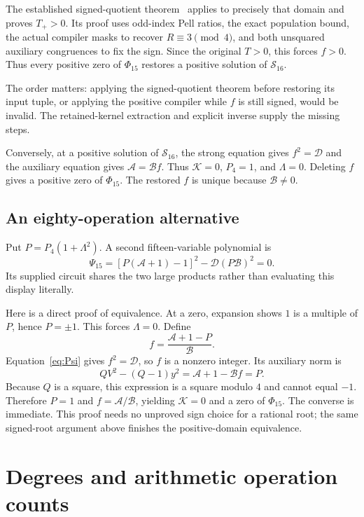 \documentclass[11pt]{article}
\theoremstyle{remark}\newtheorem{remark}[theorem]{Remark}
\begin{document}
The established signed-quotient theorem~\cite{SignedSoundness} applies to precisely that domain and proves $T_+>0$. Its proof uses odd-index Pell ratios, the exact population bound, the actual compiler masks to recover $R\equiv3\pmod4$, and both unsquared auxiliary congruences to fix the sign. Since the original $T>0$, this forces $f>0$. Thus every positive zero of $\Phi_{15}$ restores a positive solution of $\mathcal S_{16}$.

The order matters: applying the signed-quotient theorem before restoring its input tuple, or applying the positive compiler while $f$ is still signed, would be invalid. The retained-kernel extraction and explicit inverse supply the missing steps.

Conversely, at a positive solution of $\mathcal S_{16}$, the strong equation gives $f^2=\mathcal D$ and the auxiliary equation gives $\mathcal A=\mathcal Bf$. Thus $\mathcal K=0$, $P_4=1$, and $\Lambda=0$. Deleting $f$ gives a positive zero of $\Phi_{15}$. The restored $f$ is unique because $\mathcal B\ne0$.

\subsection{An eighty-operation alternative}

Put $P=P_4(1+\Lambda^2)$. A second fifteen-variable polynomial is
\begin{equation}\boxed{\quad\Psi_{15}=[P(\mathcal A+1)-1]^2-\mathcal D(P\mathcal B)^2=0.\quad}\label{eq:Psi}
\end{equation}
Its supplied circuit shares the two large products rather than evaluating this display literally.

Here is a direct proof of equivalence. At a zero, expansion shows $1$ is a multiple of $P$, hence $P=\pm1$. This forces $\Lambda=0$. Define
\[
 f=\frac{\mathcal A+1-P}{\mathcal B}.
\]
Equation~\eqref{eq:Psi} gives $f^2=\mathcal D$, so $f$ is a nonzero integer. Its auxiliary norm is
\[
 QV^2-(Q-1)y^2=\mathcal A+1-\mathcal Bf=P.
\]
Because $Q$ is a square, this expression is a square modulo $4$ and cannot equal $-1$. Therefore $P=1$ and $f=\mathcal A/\mathcal B$, yielding $\mathcal K=0$ and a zero of $\Phi_{15}$. The converse is immediate. This proof needs no unproved sign choice for a rational root; the same signed-root argument above finishes the positive-domain equivalence.

\section{Degrees and arithmetic operation counts}
\end{document}

